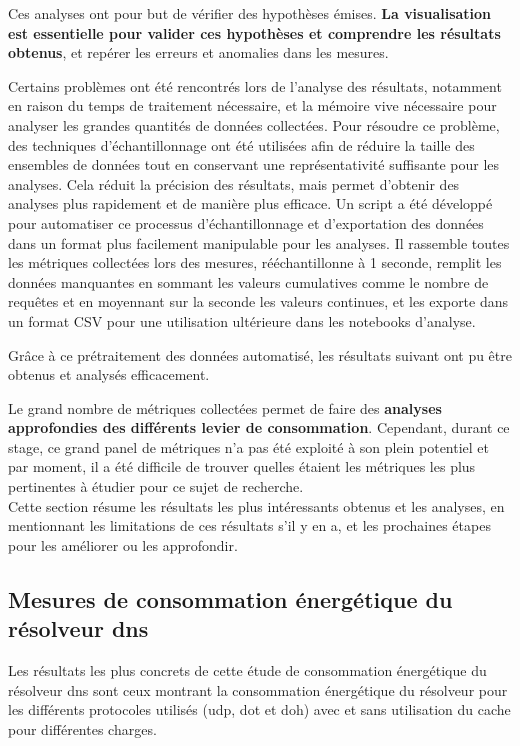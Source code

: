 \documentclass[12pt, a4paper]{report}
\begin{document}
	Ces analyses ont pour but de vérifier des hypothèses émises. \textbf{La visualisation est essentielle pour valider ces hypothèses et comprendre les résultats obtenus}, et repérer les erreurs et anomalies dans les mesures. 

	Certains problèmes ont été rencontrés lors de l'analyse des résultats, notamment en raison du temps de traitement nécessaire, et la mémoire vive nécessaire pour analyser les grandes quantités de données collectées. Pour résoudre ce problème, des techniques d'échantillonnage ont été utilisées afin de réduire la taille des ensembles de données tout en conservant une représentativité suffisante pour les analyses. Cela réduit la précision des résultats, mais permet d'obtenir des analyses plus rapidement et de manière plus efficace. Un script a été développé pour automatiser ce processus d'échantillonnage et d'exportation des données dans un format plus facilement manipulable pour les analyses. Il rassemble toutes les métriques collectées lors des mesures, rééchantillonne à 1 seconde, remplit les données manquantes en sommant les valeurs cumulatives comme le nombre de requêtes et en moyennant sur la seconde les valeurs continues, et les exporte dans un format CSV pour une utilisation ultérieure dans les notebooks d'analyse.

	Grâce à ce prétraitement des données automatisé, les résultats suivant ont pu être obtenus et analysés efficacement. 
	
	Le grand nombre de métriques collectées permet de faire des \textbf{analyses approfondies des différents levier de consommation}. Cependant, durant ce stage, ce grand panel de métriques n'a pas été exploité à son plein potentiel et par moment, il a été difficile de trouver quelles étaient les métriques les plus pertinentes à étudier pour ce sujet de recherche.\\

	Cette section résume les résultats les plus intéressants obtenus et les analyses, en mentionnant les limitations de ces résultats s'il y en a, et les prochaines étapes pour les améliorer ou les approfondir.

	\subsection{Mesures de consommation énergétique du résolveur \gls{dns}}
	
	Les résultats les plus concrets de cette étude de consommation énergétique du résolveur \gls{dns} sont ceux montrant la consommation énergétique du résolveur pour les différents protocoles utilisés (\gls{udp}, \gls{dot} et \gls{doh}) avec et sans utilisation du cache pour différentes charges.
	
\end{document}
